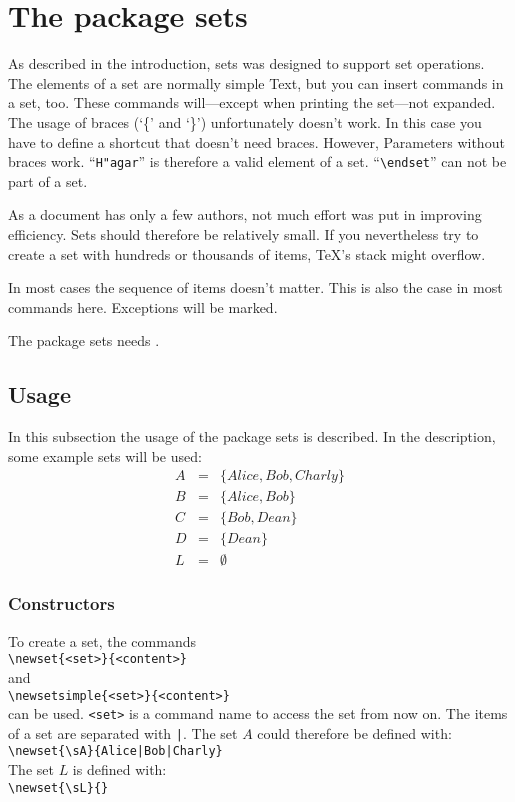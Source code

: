\section{The package sets}\label{sets}

As described in the introduction, sets was designed to support set operations. The elements of a set are normally simple Text, but you can insert commands in a set, too.
These commands will---except when printing the set---not expanded.
The usage of braces (`\{' and `\}') unfortunately doesn't work. In this case you have to define a shortcut that doesn't need braces. However, Parameters without braces work.
``\verb|H"agar|'' is therefore a valid element of a set. ``\verb|\endset|'' can not be part of a set.

As a document has only a few authors, not much effort was put in improving efficiency.
Sets should therefore be relatively small. If you nevertheless try to create a set with hundreds or thousands of items, \TeX's stack might overflow.

In most cases the sequence of items doesn't matter. This is also the case in most commands here. Exceptions will be marked.

The package sets needs \LaTeXe.

\subsection{Usage}\label{sets-usage}

In this subsection the usage of the package sets is described. In the description, some example sets will be used:
\begin{eqnarray*}
	A &=& \{Alice, Bob, Charly\}\\
	B &=& \{Alice, Bob\}\\
	C &=& \{Bob, Dean\}\\
	D &=& \{Dean\}\\
	L &=& \emptyset
\end{eqnarray*}

\subsubsection{Constructors}\label{constructors}
To create a set, the commands\\
\mbox{}\hspace{2em}\verb$\newset{<set>}{<content>}$\\
and\\
\mbox{}\hspace{2em}\verb$\newsetsimple{<set>}{<content>}$\\
can be used. \texttt{<set>} is a command name to access the set from now on.
The items of a set are separated with \texttt{|}. The set $A$ could therefore be defined with:\\
\mbox{}\hspace{2em}\verb$\newset{\sA}{Alice|Bob|Charly}$\\
The set $L$ is defined with:\\
\mbox{}\hspace{2em}\verb$\newset{\sL}{}$\\


